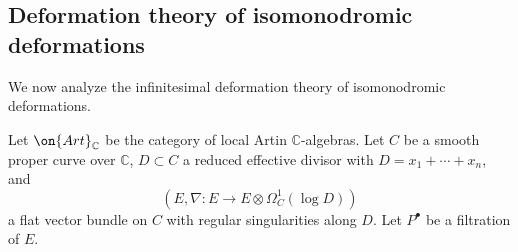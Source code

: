 \subsection{Deformation theory of isomonodromic deformations}\label{subsection:filtered-bundle-deformations}
We now analyze the infinitesimal deformation theory of isomonodromic
deformations.
\begin{notation}
\notready\label{notation:deformation-theory-iso}
    Let $\on{Art}_{\mathbb{C}}$ be the category of local Artin
$\mathbb{C}$-algebras. Let $C$ be a smooth proper curve over $\mathbb{C}$,
$D\subset C$ a reduced effective divisor with $D=x_1+\cdots+x_n$, and $$({E}, \nabla: {E}\to
{E}\otimes\Omega^1_C(\log D))$$ a flat vector bundle on $C$ with regular
singularities along $D$. Let $P^\bullet$ be a filtration of $E$.
\end{notation}


